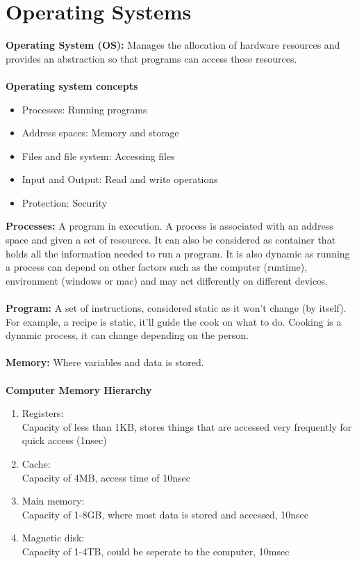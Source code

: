 \documentclass[a4paper,10pt]{article}
\begin{document}
\section{Operating Systems}
\textcolor{WildStrawberry}{\textbf{Operating System (OS):}} Manages the allocation of hardware resources and provides an abstraction so that programs can access these resources. \\\\
\textbf{Operating system concepts} 
\renewcommand{\labelitemi}{\textperiodcentered}
\begin{itemize}
\item \textcolor{WildStrawberry}{Processes:} Running programs 
\item \textcolor{WildStrawberry}{Address spaces:} Memory and storage
\item \textcolor{WildStrawberry}{Files and file system:} Accessing files
\item \textcolor{WildStrawberry}{Input and Output:} Read and write operations
\item \textcolor{WildStrawberry}{Protection:} Security 
\end{itemize}
\textcolor{WildStrawberry}{\textbf{Processes:}} A program in execution. A process is associated with an address space and given a set of resources. It can also be considered as container that holds all the information needed to run a program. It is also dynamic as running a process can depend on other factors such as the computer (runtime), environment (windows or mac) and may act differently on different devices. \\\\
\textcolor{WildStrawberry}{\textbf{Program:}} A set of instructions, considered static as it won't change (by itself). For example, a recipe is static, it'll guide the cook on what to do. Cooking is a dynamic process, it can change depending on the person. \\\\
\textcolor{WildStrawberry}{\textbf{Memory:}} Where variables and data is stored.  \\\\
\textbf{Computer Memory Hierarchy} 

\begin{enumerate}
\item \textcolor{WildStrawberry}{Registers:}\\
Capacity of less than 1KB, stores things that are accessed very frequently for quick access (1nsec)
\item \textcolor{WildStrawberry}{Cache:}\\
Capacity of 4MB, access time of 10nsec
\item \textcolor{WildStrawberry}{Main memory:} \\
Capacity of 1-8GB, where most data is stored and accessed, 10nsec 
\item \textcolor{WildStrawberry}{Magnetic disk:}\\
Capacity of 1-4TB, could be seperate to the computer, 10msec 
\end{enumerate}
\end{document}
